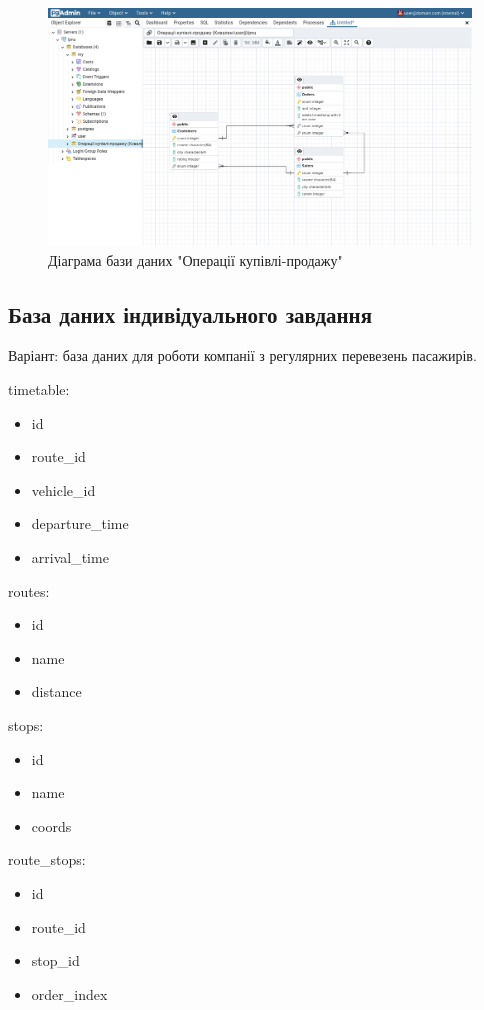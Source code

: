 \documentclass[14pt]{extreport}
\begin{document}
\begin{normalsize}
	\begin{figure}[H]
		\centering
		\includegraphics[scale=0.35]{16}
		\caption{Діаграма бази даних "Операції купівлі-продажу"}
	\end{figure}

	\subsection*{База даних індивідуального завдання}
	Варіант: база даних для роботи компанії з регулярних перевезень пасажирів.

	timetable:
	\begin{itemize}
		\item id
		\item route\_id
		\item vehicle\_id
		\item departure\_time
		\item arrival\_time
	\end{itemize}

	routes:
	\begin{itemize}
		\item id
		\item name
		\item distance
	\end{itemize}
	
	stops:
	\begin{itemize}
		\item id
		\item name
		\item coords
	\end{itemize}
	
	route\_stops:
	\begin{itemize}
		\item id
		\item route\_id
		\item stop\_id
		\item order\_index
	\end{itemize}


\end{normalsize}
\end{document}
